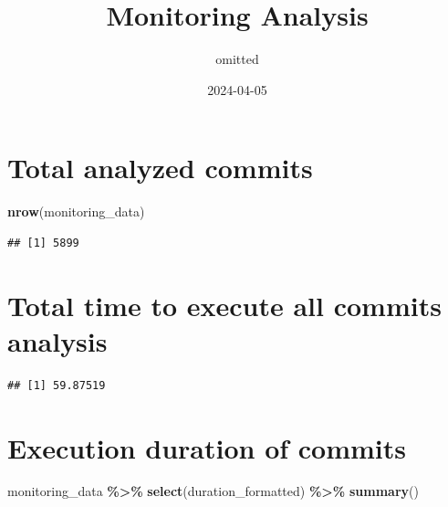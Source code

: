 \documentclass[
]{article}
\title{Monitoring Analysis}
\author{omitted}
\date{2024-04-05}
\newenvironment{Shaded}{\begin{snugshade}}{\end{snugshade}}
\newcommand{\DecValTok}[1]{\textcolor[rgb]{0.00,0.00,0.81}{#1}}
\newcommand{\FunctionTok}[1]{\textcolor[rgb]{0.13,0.29,0.53}{\textbf{#1}}}
\newcommand{\NormalTok}[1]{#1}
\newcommand{\OtherTok}[1]{\textcolor[rgb]{0.56,0.35,0.01}{#1}}
\newcommand{\SpecialCharTok}[1]{\textcolor[rgb]{0.81,0.36,0.00}{\textbf{#1}}}
\begin{document}
\maketitle

\section{Total analyzed commits}\label{total-analyzed-commits}

\begin{Shaded}
\begin{Highlighting}[]
\FunctionTok{nrow}\NormalTok{(monitoring\_data)}
\end{Highlighting}
\end{Shaded}

\begin{verbatim}
## [1] 5899
\end{verbatim}

\section{Total time to execute all commits
analysis}\label{total-time-to-execute-all-commits-analysis}

\begin{Shaded}
\end{Shaded}

\begin{verbatim}
## [1] 59.87519
\end{verbatim}

\section{Execution duration of
commits}\label{execution-duration-of-commits}

\begin{Shaded}
\begin{Highlighting}[]
\NormalTok{monitoring\_data }\SpecialCharTok{\%\textgreater{}\%}
    \FunctionTok{select}\NormalTok{(duration\_formatted) }\SpecialCharTok{\%\textgreater{}\%}
    \FunctionTok{summary}\NormalTok{()}
\end{Highlighting}
\end{Shaded}
\end{document}
